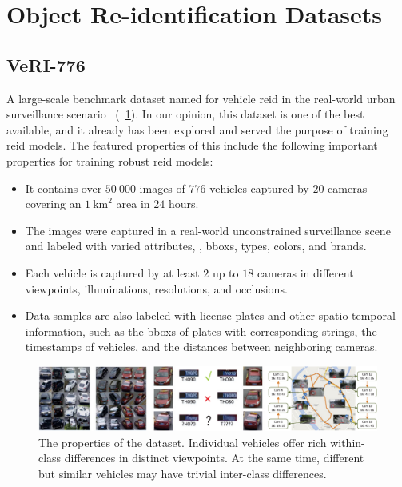\section{Object Re-identification Datasets}
\label{sec:ObjectReIDDatasets}

\subsection{VeRI-776}
\label{ssec:DatasetVeRI776}

A large-scale benchmark dataset named \verisss{} for vehicle \gls{reid} in the real-world urban surveillance scenario~\cite{liu2018provid} (\figtext{}~\ref{fig:VeRI776Dataset}). In our opinion, this dataset is one of the best available, and it already has been explored and served the purpose of training \gls{reid} models. The featured properties of this include the following important properties for training robust \gls{reid} models:

\begin{itemize}
    \item It contains over $50\ 000$ images of $776$ vehicles captured by $20$ cameras covering an $1\  \text{km}^2$ area in $24$ hours.
    \item The images were captured in a real-world unconstrained surveillance scene and labeled with varied attributes, \egtext{}, \glspl{bbox}, types, colors, and brands.
    \item Each vehicle is captured by at least $2$ up to $18$ cameras in different viewpoints, illuminations, resolutions, and occlusions.
    \item Data samples are also labeled with license plates and other spatio-temporal information, such as the \glspl{bbox} of plates with corresponding strings, the timestamps of vehicles, and the distances between neighboring cameras.
\end{itemize}

\begin{figure}[t]
    \centerline{\includegraphics[width=\linewidth]{figures/datasets/veri776__overview.pdf}}
    \caption[\verisss{} dataset]{The properties of the \verisss{} dataset. Individual vehicles offer rich within-class differences in distinct viewpoints. At the same time, different but similar vehicles may have trivial inter-class differences. }
    \label{fig:VeRI776Dataset}
\end{figure}
